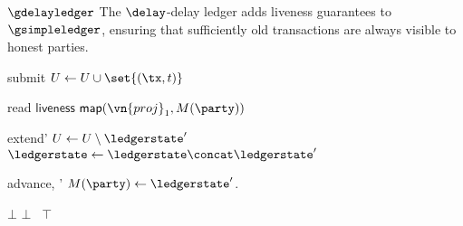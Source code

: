 \begin{functionality}{$\gdelayledger$}
  The $\delay$-delay ledger adds liveness guarantees to $\gsimpleledger$,
  ensuring that sufficiently old transactions are always visible to honest
  parties.
  \begin{statedecl}
  \end{statedecl}
  \begin{receive}{submit}{\tx}
    \State {}
    \State \Let $U \gets U \cup \set{(\tx, t)}$
    \State {}
  \end{receive}
  \begin{receive}{read}{}
    \State \Assert $\mathsf{liveness}$
    \State \Return $\mathsf{map}(\vn{proj}_1, M(\party))$
  \end{receive}
  \begin{receive}[adversary]{extend}{\ledgerstate'}
      \State \Let $U \gets U \setminus \ledgerstate'$
      \State \Let $\ledgerstate \gets \ledgerstate \concat \ledgerstate'$
    \EndIf
  \end{receive}
  \begin{receive}[adversary]{advance}{\party, \ledgerstate'}
      \State \Let $M(\party) \gets \ledgerstate'$.
    \EndIf
  \end{receive}
  \begin{helpers}
      \State {}
        \Return $\bot$
        \Return $\bot$
      \Else
        ~\Return $\top$
      \EndIf
    \EndProcedure
  \end{helpers}
\end{functionality}
